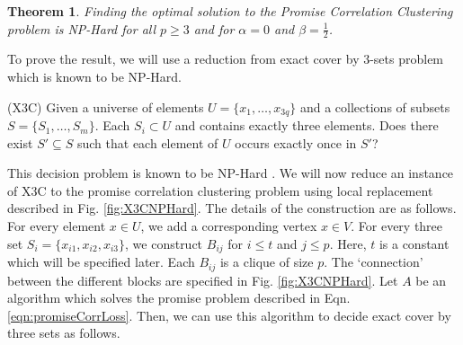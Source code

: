 \documentclass[12pt]{article}
\newtheorem{theorem}{Theorem}
\begin{document}
\begin{figure*}[!ht]
\caption{Part of graph $G$ constructed for the subset $S_i =  \{x_{i1}, x_{i2}, x_{i3}\}$. The graph is constructed by local replacement for $p = 4$. The vertices labeled $x_{ij}$ correspond to the elements in the universe $U$. If $S_i$ is included in the exact cover then the edges colored black and the edges colored blue represent the corresponding clustering of this part of the graph $G$. If $S_i$ is not included in the exact cover then the edges colored red and the edges colored black represent the clustering of this part of the graph.}
\label{fig:X3CNPHard}
\end{figure*}

\begin{theorem}
Finding the optimal solution to the Promise Correlation Clustering problem is NP-Hard for all $p \ge 3$ and for $\alpha = 0$ and $\beta = \frac{1}{2}$.  
\end{theorem}

\noindent To prove the result, we will use a reduction from exact cover by $3$-sets problem which is known to be NP-Hard.

(X3C) Given a universe of elements $U = \{x_1, \ldots, x_{3q}\}$ and a collections of subsets $S = \{S_1, \ldots, S_m\}$. Each $S_i \subset U$ and contains exactly three elements. Does there exist $S' \subseteq S$ such that each element of $U$ occurs exactly once in $S'$?

This decision problem is known to be NP-Hard \cite{garey2002computers}. We will now reduce an instance of X3C to the promise correlation clustering problem using local replacement described in Fig. \ref{fig:X3CNPHard}. The details of the construction are as follows. For every element $x \in U$, we add a corresponding vertex $x \in V$. For every three set $S_i = \{x_{i1}, x_{i2}, x_{i3}\}$, we construct $B_{ij}$ for $i \le t$ and $j \le p$. Here, $t$ is a constant which will be specified later. Each $B_{ij}$ is a clique of size $p$. The `connection' between the different blocks are specified in Fig. \ref{fig:X3CNPHard}. Let $A$ be an algorithm which solves the promise problem described in Eqn. \ref{eqn:promiseCorrLoss}. Then, we can use this algorithm to decide exact cover by three sets as follows.
\end{document}
